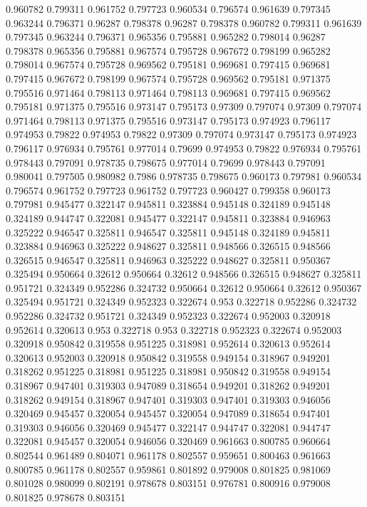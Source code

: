 0.960782 0.799311
0.961752 0.797723
0.960534 0.796574
0.961639 0.797345
0.963244 0.796371
0.96287 0.798378
0.96287 0.798378
0.960782 0.799311
0.961639 0.797345
0.963244 0.796371
0.965356 0.795881
0.965282 0.798014
0.96287 0.798378
0.965356 0.795881
0.967574 0.795728
0.967672 0.798199
0.965282 0.798014
0.967574 0.795728
0.969562 0.795181
0.969681 0.797415
0.969681 0.797415
0.967672 0.798199
0.967574 0.795728
0.969562 0.795181
0.971375 0.795516
0.971464 0.798113
0.971464 0.798113
0.969681 0.797415
0.969562 0.795181
0.971375 0.795516
0.973147 0.795173
0.97309 0.797074
0.97309 0.797074
0.971464 0.798113
0.971375 0.795516
0.973147 0.795173
0.974923 0.796117
0.974953 0.79822
0.974953 0.79822
0.97309 0.797074
0.973147 0.795173
0.974923 0.796117
0.976934 0.795761
0.977014 0.79699
0.974953 0.79822
0.976934 0.795761
0.978443 0.797091
0.978735 0.798675
0.977014 0.79699
0.978443 0.797091
0.980041 0.797505
0.980982 0.7986
0.978735 0.798675
0.960173 0.797981
0.960534 0.796574
0.961752 0.797723
0.961752 0.797723
0.960427 0.799358
0.960173 0.797981
0.945477 0.322147
0.945811 0.323884
0.945148 0.324189
0.945148 0.324189
0.944747 0.322081
0.945477 0.322147
0.945811 0.323884
0.946963 0.325222
0.946547 0.325811
0.946547 0.325811
0.945148 0.324189
0.945811 0.323884
0.946963 0.325222
0.948627 0.325811
0.948566 0.326515
0.948566 0.326515
0.946547 0.325811
0.946963 0.325222
0.948627 0.325811
0.950367 0.325494
0.950664 0.32612
0.950664 0.32612
0.948566 0.326515
0.948627 0.325811
0.951721 0.324349
0.952286 0.324732
0.950664 0.32612
0.950664 0.32612
0.950367 0.325494
0.951721 0.324349
0.952323 0.322674
0.953 0.322718
0.952286 0.324732
0.952286 0.324732
0.951721 0.324349
0.952323 0.322674
0.952003 0.320918
0.952614 0.320613
0.953 0.322718
0.953 0.322718
0.952323 0.322674
0.952003 0.320918
0.950842 0.319558
0.951225 0.318981
0.952614 0.320613
0.952614 0.320613
0.952003 0.320918
0.950842 0.319558
0.949154 0.318967
0.949201 0.318262
0.951225 0.318981
0.951225 0.318981
0.950842 0.319558
0.949154 0.318967
0.947401 0.319303
0.947089 0.318654
0.949201 0.318262
0.949201 0.318262
0.949154 0.318967
0.947401 0.319303
0.947401 0.319303
0.946056 0.320469
0.945457 0.320054
0.945457 0.320054
0.947089 0.318654
0.947401 0.319303
0.946056 0.320469
0.945477 0.322147
0.944747 0.322081
0.944747 0.322081
0.945457 0.320054
0.946056 0.320469
0.961663 0.800785
0.960664 0.802544
0.961489 0.804071
0.961178 0.802557
0.959651 0.800463
0.961663 0.800785
0.961178 0.802557
0.959861 0.801892
0.979008 0.801825
0.981069 0.801028
0.980099 0.802191
0.978678 0.803151
0.976781 0.800916
0.979008 0.801825
0.978678 0.803151
